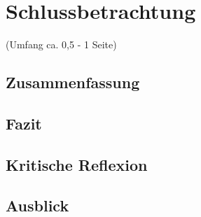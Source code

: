 \newpage
\section{Schlussbetrachtung}
(Umfang ca. 0,5 - 1 Seite)

\subsection{Zusammenfassung}

\subsection{Fazit}

\subsection{Kritische Reflexion}

\subsection{Ausblick}
